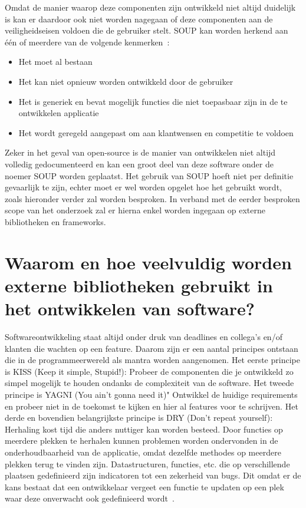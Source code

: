 Omdat de manier waarop deze componenten zijn ontwikkeld niet altijd duidelijk is kan er daardoor ook niet worden nagegaan of deze componenten aan de veiligheidseisen voldoen die de gebruiker stelt. SOUP kan worden herkend aan één of meerdere van de volgende kenmerken~\citep{Bischop:2001}:
\begin{itemize}
    \item Het moet al bestaan
    \item Het kan niet opnieuw worden ontwikkeld door de gebruiker
    \item Het is generiek en bevat mogelijk functies die niet toepasbaar zijn in de te ontwikkelen applicatie
    \item Het wordt geregeld aangepast om aan klantwensen en competitie te voldoen
\end{itemize}

Zeker in het geval van open-source is de manier van ontwikkelen niet altijd volledig gedocumenteerd en kan een groot deel van deze software onder de noemer SOUP worden geplaatst. Het gebruik van SOUP hoeft niet per definitie gevaarlijk te zijn, echter moet er wel worden opgelet hoe het gebruikt wordt, zoals hieronder verder zal worden besproken. In verband met de eerder besproken scope van het onderzoek zal er hierna enkel worden ingegaan op externe bibliotheken en frameworks.

\section{Waarom en hoe veelvuldig worden externe bibliotheken gebruikt in het ontwikkelen van software?}\label{sec:waarom-hoe}
Softwareontwikkeling staat altijd onder druk van deadlines en collega's en/of klanten die wachten op een feature. Daarom zijn er een aantal principes ontstaan die in de programmeerwereld als mantra worden aangenomen. Het eerste principe is KISS (Keep it simple, Stupid!): Probeer de componenten die je ontwikkeld zo simpel mogelijk te houden ondanks de complexiteit van de software. Het tweede principe is YAGNI (You ain't gonna need it)" Ontwikkel de huidige requirements en probeer niet in de toekomst te kijken en hier al features voor te schrijven. Het derde en bovendien belangrijkste principe is DRY (Don't repeat yourself): Herhaling kost tijd die anders nuttiger kan worden besteed. Door functies op meerdere plekken te herhalen kunnen problemen worden ondervonden in de onderhoudbaarheid van de applicatie, omdat dezelfde methodes op meerdere plekken terug te vinden zijn. Datastructuren, functies, etc. die op verschillende plaatsen gedefinieerd zijn indicatoren tot een zekerheid van bugs. Dit omdat er de kans bestaat dat een ontwikkelaar vergeet een functie te updaten op een plek waar deze onverwacht ook gedefinieerd wordt~\citep{Papadopoulo:2021}.

